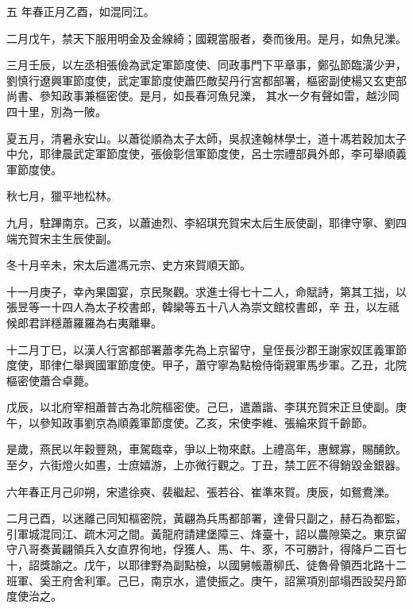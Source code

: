 
\begin{pinyinscope}

 五
 年春正月乙酉，如混同江。



 二月戊午，禁天下服用明金及金線綺；國親當服者，奏而後用。是月，如魚兒濼。



 三月壬辰，以左丞相張儉為武定軍節度使、同政事門下平章事，鄭弘節臨潢少尹，劉慎行遼興軍節度使，武定軍節度使蕭匹敵契丹行宮都部署，樞密副使楊又玄吏部尚書、參知政事兼樞密使。是月，如長春河魚兒濼，
 其水一夕有聲如雷，越沙岡四十里，別為一陂。



 夏五月，清暑永安山。以蕭從順為太子太師，吳叔達翰林學士，道十馮若穀加太子中允，耶律晨武定軍節度使，張儉彰信軍節度使，呂士宗禮部員外郎，李可舉順義軍節度使。



 秋七月，獵平地松林。



 九月，駐蹕南京。己亥，以蕭迪烈、李紹琪充賀宋太后生辰使副，耶律守寧、劉四端充賀宋主生辰使副。



 冬十月辛未，宋太后遣馮元宗、史方來賀順天節。



 十一月庚子，幸內果園宴，京民聚觀。求進士得七十二人，命賦詩，第其工拙，以張昱等一十四人為太子校書郎，韓欒等五十八人為崇文館校書郎，辛
 丑，以左祗候郎君詳穩蕭羅羅為右夷離畢。



 十二月丁巳，以漢人行宮都部署蕭孝先為上京留守，皇侄長沙郡王謝家奴匡義軍節度使，耶律仁舉興國軍節度使。甲子，蕭守寧為點檢侍衛親軍馬步軍。乙丑，北院樞密使蕭合卓薨。



 戊辰，以北府宰相蕭普古為北院樞密使。己巳，遣蕭諧、李琪充賀宋正旦使副。庚午，以參知政事劉京為順義軍節度使。乙亥，宋使李維、張綸來賀千齡節。



 是歲，燕民以年穀豐熟，車駕臨幸，爭以上物來獻。上禮高年，惠鰥寡，賜酺飲。至夕，六街燈火如晝，士庶嬉游，上亦微行觀之。丁丑，禁工匠不得銷毀金銀器。



 六年春正月己卯朔，宋遣徐奭、裴繼起、張若谷、崔準來賀。庚辰，如鴛鴦濼。



 二月己酉，以迷離己同知樞密院，黃翩為兵馬都部署，達骨只副之，赫石為都監，引軍城混同江、疏木河之間。黃龍府請建堡障三、烽臺十，詔以農隙築之。東京留守八哥奏黃翩領兵入女直界徇地，俘獲人、馬、牛、豕，不可勝計，得降戶二百七十，詔獎諭之。戊午，以耶律野為副點檢，以國舅帳蕭柳氏、徒魯骨領西北路十二班軍、奚王府舍利軍。己巳，南京水，遣使振之。庚午，詔黨項別部塌西設契丹節度使治之。




\end{pinyinscope}

